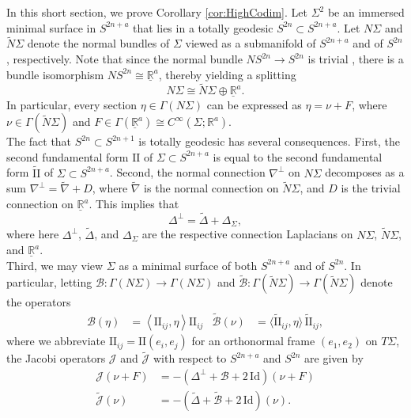 \documentclass[11pt]{article}
\newcommand{\R}{\mathbb{R}}
\theoremstyle{definition}
\numberwithin{equation}{section}
\begin{document}
\indent \indent In this short section, we prove Corollary \ref{cor:HighCodim}. Let $\Sigma^2$ be an immersed minimal surface in $S^{2n+a}$ that lies in a totally geodesic $S^{2n} \subset S^{2n+a}$.  Let $N\Sigma$ and $\widetilde{N}\Sigma$ denote the normal bundles of $\Sigma$ viewed as a submanifold of $S^{2n+a}$ and of $S^{2n}$, respectively.  Note that since the normal bundle $NS^{2n} \to S^{2n}$ is trivial \cite{Simons68}, there is a bundle isomorphism $NS^{2n} \cong \underline{\R}^a$, thereby yielding a splitting
$$N\Sigma \cong \widetilde{N}\Sigma \oplus \underline{\R}^a.$$
In particular, every section $\eta \in \Gamma(N\Sigma)$ can be expressed as $\eta = \nu + F$, where $\nu \in \Gamma(\widetilde{N}\Sigma)$ and $F \in \Gamma(\underline{\R}^a) \cong C^\infty(\Sigma; \R^a)$. \\
\indent The fact that $S^{2n} \subset S^{2n+1}$ is totally geodesic has several consequences.  First, the second fundamental form $\mathrm{I\!I}$ of $\Sigma \subset S^{2n+a}$ is equal to the second fundamental form $\widetilde{\mathrm{I\!I}}$ of $\Sigma \subset S^{2n+a}$.  Second, the normal connection $\nabla^\perp$ on $N\Sigma$ decomposes as a sum $\nabla^\perp = \widetilde{\nabla} + D$, where $\widetilde{\nabla}$ is the normal connection on $\widetilde{N}\Sigma$, and $D$ is the trivial connection on $\underline{\R}^a$.  This implies that
$$\Delta^\perp = \widetilde{\Delta} + \Delta_\Sigma,$$
where here $\Delta^\perp$, $\widetilde{\Delta}$, and $\Delta_\Sigma$ are the respective connection Laplacians on $N\Sigma$, $\widetilde{N}\Sigma$, and $\underline{\R}^a$.   \\
\indent Third, we may view $\Sigma$ as a minimal surface of both $S^{2n+a}$ and of $S^{2n}$.  In particular, letting $\mathscr{B} \colon \Gamma(N\Sigma) \to \Gamma(N\Sigma)$ and $\widetilde{\mathscr{B}} \colon \Gamma(\widetilde{N}\Sigma) \to \Gamma(\widetilde{N}\Sigma)$ denote the operators
\begin{align*}
\mathscr{B}(\eta) & = \left\langle \mathrm{I\!I}_{ij}, \eta \right\rangle \mathrm{I\!I}_{ij} & \widetilde{\mathscr{B}}(\nu) & = \langle \widetilde{\mathrm{I\!I}}_{ij}, \eta \rangle\, \widetilde{\mathrm{I\!I}}_{ij},
\end{align*}
where we abbreviate $\mathrm{I\!I}_{ij} = \mathrm{I\!I}(e_i, e_j)$ for an orthonormal frame $(e_1, e_2)$ on $T\Sigma$, the Jacobi operators $\mathscr{J}$ and $\widetilde{\mathscr{J}}$ with respect to $S^{2n+a}$ and $S^{2n}$ are given by
\begin{align*}
\mathscr{J}(\nu + F) & = -(\Delta^\perp + \mathscr{B} + 2\,\mathrm{Id})(\nu + F) \\
\widetilde{\mathscr{J}}(\nu) & = -(\widetilde{\Delta} + \widetilde{\mathscr{B}} + 2\,\mathrm{Id})(\nu).
\end{align*}
\end{document}
